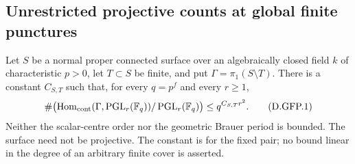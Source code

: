 \subsection{Unrestricted projective counts at global finite punctures}

\begin{theorem}
\label{D:global-finite-puncture-projective-growth}
Let $S$ be a normal proper connected surface over an algebraically
closed field $k$ of characteristic $p>0$, let $T\subset S$ be finite,
and put $\Gamma=\pi_1(S\setminus T)$. There is a constant $C_{S,T}$
such that, for every $q=p^f$ and every $r\geq1$,
\[
 \#\bigl(\operatorname{Hom}_{\rm cont}
       (\Gamma,\operatorname{PGL}_r(\mathbb F_q))
                 /\operatorname{PGL}_r(\mathbb F_q)\bigr)
                          \leq q^{C_{S,T}r^2}.           \tag{D.GFP.1}
\]
Neither the scalar-centre order nor the geometric Brauer period is
bounded. The surface need not be projective. The constant is for the
fixed pair; no bound linear in the degree of an arbitrary finite
cover is asserted.
\end{theorem}

